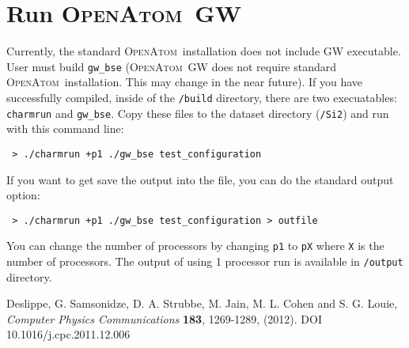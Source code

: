 \documentclass[12pt,draft]{article}
\newcommand{\openatom}{\textsc{OpenAtom}}
\begin{document}
\section{Run \openatom\ GW}
Currently, the standard \openatom\ installation does not include GW executable. User must build \verb+gw_bse+  (\openatom\ GW does not require standard \openatom\ installation. This may change in the near future). If you have successfully compiled, inside of the \verb+/build+ directory, there are two execuatables: \verb+charmrun+ and \verb+gw_bse+. Copy these files to the dataset directory (\verb+/Si2+) and run with this command line:

\begin{verbatim}
 > ./charmrun +p1 ./gw_bse test_configuration
\end{verbatim}

\noindent If you want to get save the output into the file, you can do the standard output option:

\begin{verbatim}
 > ./charmrun +p1 ./gw_bse test_configuration > outfile
\end{verbatim}

\noindent You can change the number of processors by changing \verb+p1+ to \verb+pX+ where \verb+X+ is the number of processors.
The output of using 1 processor run is available in \verb+/output+ directory.


\begin{thebibliography}{111}
 Deslippe, G. Samsonidze, D. A. Strubbe, M. Jain, M. L. Cohen and S. G. Louie, 	{\it Computer Physics Communications} {\bf 183}, 1269-1289, (2012).  DOI 10.1016/j.cpc.2011.12.006
\end{thebibliography}
\end{document}
